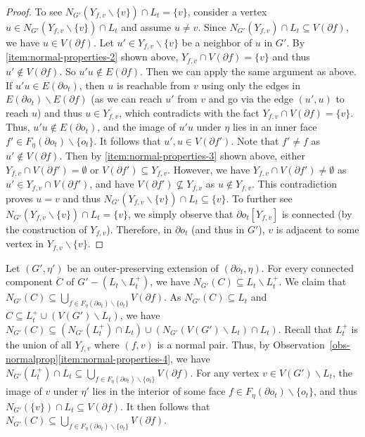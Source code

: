 \documentclass[a4paper,11pt]{article}
\numberwithin{lemma}{section}
\begin{document}
\begin{proof}
To see $N_{G'}(Y_{f,v} \backslash \{v\}) \cap L_t = \{v\}$, consider a vertex $u \in N_{G'}(Y_{f,v} \backslash \{v\}) \cap L_t$ and assume $u \neq v$.
Since $N_{G'}(Y_{f,v}) \cap L_t \subseteq V(\partial f)$, we have $u \in V(\partial f)$.
Let $u' \in Y_{f,v} \backslash \{v\}$ be a neighbor of $u$ in $G'$.
By \ref{item:normal-properties-2} shown above, $Y_{f,v} \cap V(\partial f) = \{v\}$ and thus $u' \notin V(\partial f)$.
So $u'u \notin E(\partial f)$.
Then we can apply the same argument as above.
If $u'u \in E(\partial o_t)$, then $u$ is reachable from $v$ using only the edges in $E(\partial o_t) \backslash E(\partial f)$ (as we can reach $u'$ from $v$ and go via the edge $(u',u)$ to reach $u$) and thus $u \in Y_{f,v}$, which contradicts with the fact $Y_{f,v} \cap V(\partial f) = \{v\}$.
Thus, $u'u \notin E(\partial o_t)$, and the image of $u'u$ under $\eta$ lies in an inner face $f' \in F_\eta(\partial o_t) \backslash \{o_t\}$.
It follows that $u',u \in V(\partial f')$.
Note that $f' \neq f$ as $u' \notin V(\partial f)$.
Then by \ref{item:normal-properties-3} shown above, either $Y_{f,v} \cap V(\partial f') = \emptyset$ or $V(\partial f') \subseteq Y_{f,v}$.
However, we have $Y_{f,v} \cap V(\partial f') \neq \emptyset$ as $u' \in Y_{f,v} \cap V(\partial f')$, and have $V(\partial f') \nsubseteq Y_{f,v}$ as $u \notin Y_{f,v}$.
This contradiction proves $u = v$ and thus $N_{G'}(Y_{f,v} \backslash \{v\}) \cap L_t \subseteq \{v\}$.
To further see $N_{G'}(Y_{f,v} \backslash \{v\}) \cap L_t = \{v\}$, we simply observe that $\partial o_t[Y_{f,v}]$ is connected (by the construction of $Y_{f,v}$).
Therefore, in $\partial o_t$ (and thus in $G'$), $v$ is adjacent to some vertex in $Y_{f,v} \backslash \{v\}$.
\end{proof}

Let $(G',\eta')$ be an outer-preserving extension of $(\partial o_t,\eta)$.
For every connected component $C$ of $G' - (L_t \backslash L_t^+)$, we have $N_{G'}(C) \subseteq L_t \backslash L_t^+$.
We claim that $N_{G'}(C) \subseteq \bigcup_{f \in F_\eta(\partial o_t) \backslash \{o_t\}} V(\partial f)$.
As $N_{G'}(C) \subseteq L_t$ and $C \subseteq L_t^+ \cup (V(G') \backslash L_t)$, we have $N_{G'}(C) \subseteq (N_{G'}(L_t^+) \cap L_t) \cup (N_{G'}(V(G') \backslash L_t) \cap L_t)$.
Recall that $L_t^+$ is the union of all $Y_{f,v}$ where $(f,v)$ is a normal pair.
Thus, by Observation~\ref{obs-normalprop}\ref{item:normal-properties-4}, we have $N_{G'}(L_t^+) \cap L_t \subseteq \bigcup_{f \in F_\eta(\partial o_t) \backslash \{o_t\}} V(\partial f)$.
For any vertex $v \in V(G') \backslash L_t$, the image of $v$ under $\eta'$ lies in the interior of some face $f \in F_\eta(\partial o_t) \backslash \{o_t\}$, and thus $N_{G'}(\{v\}) \cap L_t \subseteq V(\partial f)$.
It then follows that $N_{G'}(C) \subseteq \bigcup_{f \in F_\eta(\partial o_t) \backslash \{o_t\}} V(\partial f)$.
\end{document}
